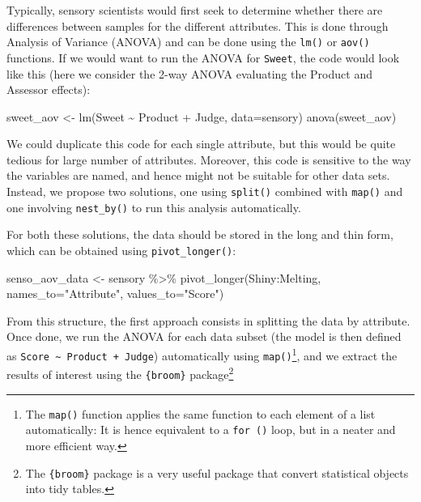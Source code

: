 \documentclass[
]{book}
\newenvironment{Shaded}{\begin{snugshade}}{\end{snugshade}}
\newcommand{\AttributeTok}[1]{\textcolor[rgb]{0.77,0.63,0.00}{#1}}
\newcommand{\FunctionTok}[1]{\textcolor[rgb]{0.00,0.00,0.00}{#1}}
\newcommand{\NormalTok}[1]{#1}
\newcommand{\OtherTok}[1]{\textcolor[rgb]{0.56,0.35,0.01}{#1}}
\newcommand{\SpecialCharTok}[1]{\textcolor[rgb]{0.00,0.00,0.00}{#1}}
\newcommand{\StringTok}[1]{\textcolor[rgb]{0.31,0.60,0.02}{#1}}
\begin{document}
Typically, sensory scientists would first seek to determine whether there are differences between samples for the different attributes. This is done through Analysis of Variance (ANOVA) and can be done using the \texttt{lm()} or \texttt{aov()} functions.
If we would want to run the ANOVA for \texttt{Sweet}, the code would look like this (here we consider the 2-way ANOVA evaluating the Product and Assessor effects):

\begin{Shaded}
\begin{Highlighting}[]
\NormalTok{sweet\_aov }\OtherTok{\textless{}{-}} \FunctionTok{lm}\NormalTok{(Sweet }\SpecialCharTok{\textasciitilde{}}\NormalTok{ Product }\SpecialCharTok{+}\NormalTok{ Judge, }\AttributeTok{data=}\NormalTok{sensory)}
\FunctionTok{anova}\NormalTok{(sweet\_aov)}
\end{Highlighting}
\end{Shaded}

We could duplicate this code for each single attribute, but this would be quite tedious for large number of attributes. Moreover, this code is sensitive to the way the variables are named, and hence might not be suitable for other data sets. Instead, we propose two solutions, one using \texttt{split()} combined with \texttt{map()} and one involving \texttt{nest\_by()} to run this analysis automatically.

For both these solutions, the data should be stored in the long and thin form, which can be obtained using \texttt{pivot\_longer()}:

\begin{Shaded}
\begin{Highlighting}[]
\NormalTok{senso\_aov\_data }\OtherTok{\textless{}{-}}\NormalTok{ sensory }\SpecialCharTok{\%\textgreater{}\%} 
  \FunctionTok{pivot\_longer}\NormalTok{(Shiny}\SpecialCharTok{:}\NormalTok{Melting, }\AttributeTok{names\_to=}\StringTok{"Attribute"}\NormalTok{, }\AttributeTok{values\_to=}\StringTok{"Score"}\NormalTok{)}
\end{Highlighting}
\end{Shaded}

From this structure, the first approach consists in splitting the data by attribute. Once done, we run the ANOVA for each data subset (the model is then defined as \texttt{Score\ \textasciitilde{}\ Product\ +\ Judge}) automatically using \texttt{map()}\footnote{The \texttt{map()} function applies the same function to each element of a list automatically: It is hence equivalent to a \texttt{for\ ()} loop, but in a neater and more efficient way.}, and we extract the results of interest using the \texttt{\{broom\}} package\footnote{The \texttt{\{broom\}} package is a very useful package that convert statistical objects into tidy tables.}
\end{document}

